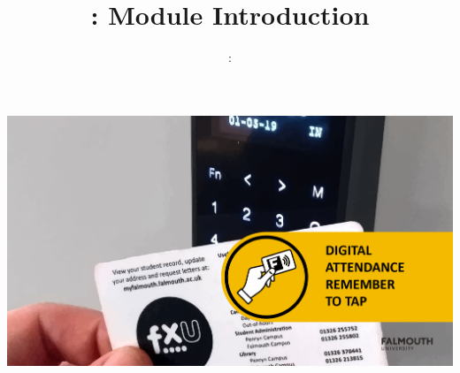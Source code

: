 \usepackage{../../beamerthemeFalmouthGamesAcademy}
\usepackage{multimedia}
\graphicspath{ {../../} }


\usepackage[normalem]{ulem}
\usepackage{wasysym}
\usepackage{graphicx} %

\usepackage{pdfpages}

\usetikzlibrary{arrows,automata}




\title{\sessionnumber: Module Introduction}
\subtitle{\modulecode: \moduletitle}

\begin{frame}
	\includegraphics[width=1.0\textwidth]{sign-in}
\end{frame}

\frame{\titlepage} 




